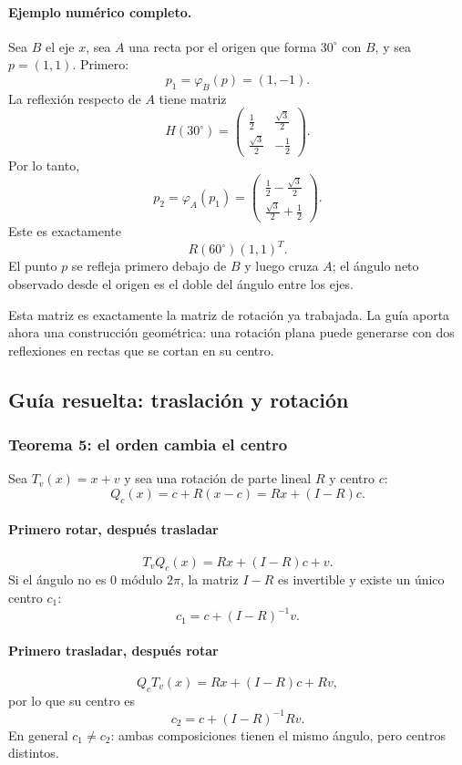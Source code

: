 \paragraph{Ejemplo numérico completo.}
Sea \(B\) el eje \(x\), sea \(A\) una recta por el origen que forma \(30^\circ\) con \(B\),
y sea \(p=(1,1)\). Primero:
\[
  p_1=\varphi_B(p)=(1,-1).
\]
La reflexión respecto de \(A\) tiene matriz
\[
H(30^\circ)=
\begin{pmatrix}
\frac12&\frac{\sqrt3}{2}\\
\frac{\sqrt3}{2}&-\frac12
\end{pmatrix}.
\]
Por lo tanto,
\[
p_2=\varphi_A(p_1)
=
\begin{pmatrix}
\frac12-\frac{\sqrt3}{2}\\[1mm]
\frac{\sqrt3}{2}+\frac12
\end{pmatrix}.
\]
Este es exactamente
\[
R(60^\circ)(1,1)^T.
\]
El punto \(p\) se refleja primero debajo de \(B\) y luego cruza \(A\); el ángulo neto observado
desde el origen es el doble del ángulo entre los ejes.

\begin{idea}
Esta matriz es exactamente la matriz de rotación ya trabajada. La guía aporta ahora
una construcción geométrica: una rotación plana puede generarse con dos reflexiones en
rectas que se cortan en su centro.
\end{idea}

\subsection{Guía resuelta: traslación y rotación}

\subsubsection{Teorema 5: el orden cambia el centro}

Sea \(T_v(x)=x+v\) y sea una rotación de parte lineal \(R\) y centro \(c\):
\[
  Q_c(x)=c+R(x-c)=Rx+(I-R)c.
\]

\paragraph*{Primero rotar, después trasladar}
\[
  T_vQ_c(x)=Rx+(I-R)c+v.
\]
Si el ángulo no es \(0\) módulo \(2\pi\), la matriz \(I-R\) es invertible y existe un único
centro \(c_1\):
\[
  \boxed{c_1=c+(I-R)^{-1}v}.
\]

\paragraph*{Primero trasladar, después rotar}
\[
  Q_cT_v(x)=Rx+(I-R)c+Rv,
\]
por lo que su centro es
\[
  \boxed{c_2=c+(I-R)^{-1}Rv}.
\]
En general \(c_1\neq c_2\): ambas composiciones tienen el mismo ángulo, pero centros distintos.

